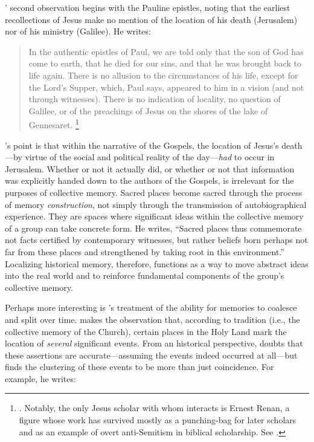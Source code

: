 \halbwachs' second observation begins with the Pauline epistles, noting that the earliest recollections of Jesus make no mention of the location of his death (Jerusalem) nor of his ministry (Galilee). He writes:  

\begin{quote}
    In the authentic epistles of Paul, we are told only that the son of God has come to earth, that he died for our sins, and that he was brought back to life again. There is no allusion to the circumstances of his life, except for the Lord's Supper, which, Paul says, appeared to him in a vision (and not through witnesses). There is no indication of locality, no question of Galilee, or of the preachings of Jesus on the shores of the lake of Gennesaret.%
        \footnote{%
            \Cite[209]{halbwachs1992}.
            Notably, the only Jesus scholar with whom \halbwachs interacts is Ernest Renan, a figure whose work has survived mostly as a punching-bag for later scholars and as an example of overt anti-Semitism in biblical scholarship. See 
            \cite[39]{heschel2008}.}
\end{quote}  
\noindent
\halbwachs's point is that within the narrative of the Gospels, the location of Jesus's death---by virtue of the social and political reality of the day---\emph{had} to occur in Jerusalem.%
    \autocite[211]{halbwachs1992}
Whether or not it actually did, or whether or not that information was explicitly handed down to the authors of the Gospels, is irrelevant for the purposes of collective memory. Sacred places become sacred through the process of memory \emph{construction}, not simply through the transmission of autobiographical experience. They are spaces where significant ideas within the collective memory of a group can take concrete form. He writes, ``Sacred places thus commemorate not facts certified by contemporary witnesses, but rather beliefs born perhaps not far from these places and strengthened by taking root in this environment.''%
    \autocite[199]{halbwachs1992}
Localizing historical memory, therefore, functions as a way to move abstract ideas into the real world and to reinforce fundamental components of the group's collective memory.  

Perhaps more interesting is \halbwachs's treatment of the ability for memories to coalesce and split over time. \halbwachs makes the observation that, according to tradition (i.e., the collective memory of the Church), certain places in the Holy Land mark the location of \emph{several} significant events. From an historical perspective, \halbwachs doubts that these assertions are accurate---assuming the events indeed occurred at all---but finds the clustering of these events to be more than just coincidence. For example, he writes:  

